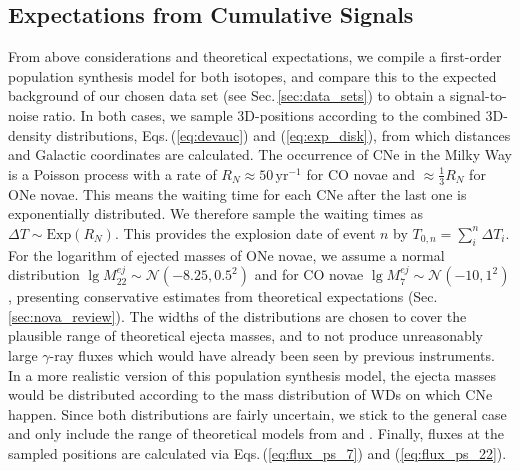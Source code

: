 \documentclass{aa}
\newcommand{\mrm}[1]{\mathrm{#1}}
\begin{document}
\subsection{Expectations from Cumulative Signals}\label{sec:cumulative_expectations}
%
From above considerations and theoretical expectations, we compile a first-order population synthesis model for both isotopes, and compare this to the expected background of our chosen data set (see Sec.\,\ref{sec:data_sets}) to obtain a signal-to-noise ratio.
%
In both cases, we sample 3D-positions according to the combined 3D-density distributions, Eqs.\,(\ref{eq:devauc}) and (\ref{eq:exp_disk}), from which distances and Galactic coordinates are calculated.
%
The occurrence of CNe in the Milky Way is a Poisson process \citep{Ross2008_StochasticProcesses} with a rate of $R_N \approx 50\,\mrm{yr^{-1}}$ for CO novae and $\approx \frac{1}{3} R_N$ for ONe novae.
%
This means the waiting time for each CNe after the last one is exponentially distributed.
%
We therefore sample the waiting times as $\Delta T \sim \mrm{Exp}(R_N)$.
%
This provides the explosion date of event $n$ by $T_{0,n} = \sum_i^n \Delta T_i$.
%
For the logarithm of ejected masses of ONe novae, we assume a normal distribution $\lg M_{22}^{ej} \sim \mathscr{N}(-8.25,0.5^2)$ and for CO novae $\lg M_{7}^{ej} \sim \mathscr{N}(-10,1^2)$, presenting conservative estimates from theoretical expectations (Sec.\,\ref{sec:nova_review}).
%
The widths of the distributions are chosen to cover the plausible range of theoretical ejecta masses, and to not produce unreasonably large $\gamma$-ray fluxes which would have already been seen by previous instruments.
%
In a more realistic version of this population synthesis model, the ejecta masses would be distributed according to the mass distribution of WDs on which CNe happen.
%
Since both distributions are fairly uncertain, we stick to the general case and only include the range of theoretical models from \citet{abcdefgh} and \citet{Starrfield2020_COnovae}.
%
Finally, fluxes at the sampled positions are calculated via Eqs.\,(\ref{eq:flux_ps_7}) and (\ref{eq:flux_ps_22}).
\end{document}
